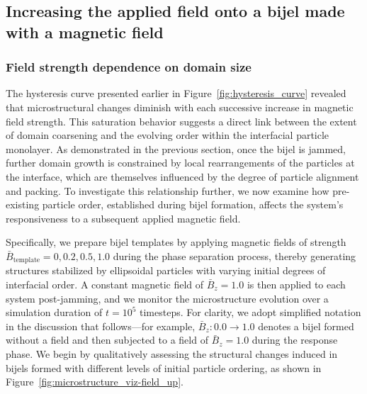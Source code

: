 \subsection{Increasing the applied field onto a bijel made with a magnetic field}
\subsubsection{Field strength dependence on domain size}
\label{section:increasing-the-applied-field}


The hysteresis curve presented earlier in Figure~\ref{fig:hysteresis_curve} revealed that microstructural changes diminish 
with each successive increase in magnetic field strength. This saturation behavior suggests a direct link between the extent of domain coarsening 
and the evolving order within the interfacial particle monolayer. As demonstrated in the previous section, once the bijel is jammed, further domain 
growth is constrained by local rearrangements of the particles at the interface, which are themselves influenced by the degree of particle alignment 
and packing. To investigate this relationship further, we now examine how pre-existing particle order, established during bijel formation, affects 
the system's responsiveness to a subsequent applied magnetic field.

Specifically, we prepare bijel templates by applying magnetic fields of strength \(\bar{B}_{\text{template}} = 0, 0.2, 0.5, 1.0\) during the phase separation 
process, thereby generating structures stabilized by ellipsoidal particles with varying initial degrees of interfacial order. A constant magnetic field of 
\(\bar{B}_z = 1.0\) is then applied to each system post-jamming, and we monitor the microstructure evolution over a simulation duration of \(t = 10^5\) 
timesteps. For clarity, we adopt simplified notation in the discussion that follows—for example, \(\bar{B}_z: 0.0 \rightarrow 1.0\) denotes a bijel 
formed without a field and then subjected to a field of \(\bar{B}_z = 1.0\) during the response phase. We begin by qualitatively assessing the 
structural changes induced in bijels formed with different levels of initial particle ordering, as shown in Figure~\ref{fig:microstructure_viz-field_up}.

